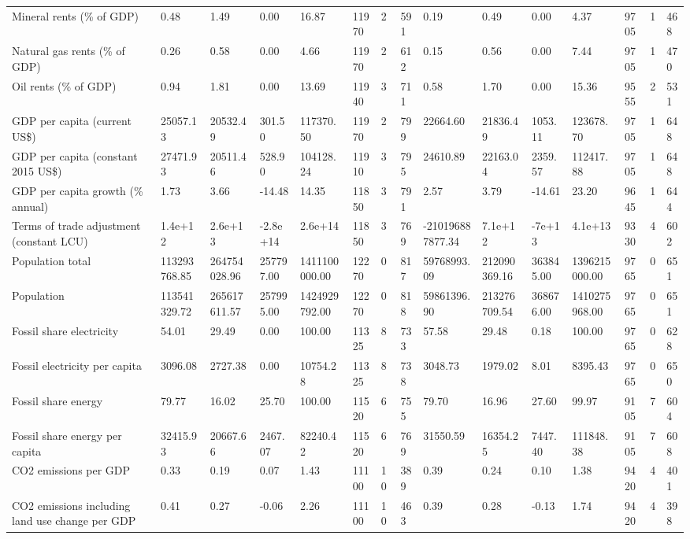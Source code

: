 \begin{longtable}{lllllllllllllll}
\addlinespace
Mineral rents (\% of GDP) & 0.48 & 1.49 & 0.00 & 16.87 & 11970 & 2 & 591 & 0.19 & 0.49 & 0.00 & 4.37 & 9705 & 1 & 468\\
Natural gas rents (\% of GDP) & 0.26 & 0.58 & 0.00 & 4.66 & 11970 & 2 & 612 & 0.15 & 0.56 & 0.00 & 7.44 & 9705 & 1 & 470\\
Oil rents (\% of GDP) & 0.94 & 1.81 & 0.00 & 13.69 & 11940 & 3 & 711 & 0.58 & 1.70 & 0.00 & 15.36 & 9555 & 2 & 531\\
GDP per capita (current US\$) & 25057.13 & 20532.49 & 301.50 & 117370.50 & 11970 & 2 & 799 & 22664.60 & 21836.49 & 1053.11 & 123678.70 & 9705 & 1 & 648\\
GDP per capita (constant 2015 US\$) & 27471.93 & 20511.46 & 528.90 & 104128.24 & 11910 & 3 & 795 & 24610.89 & 22163.04 & 2359.57 & 112417.88 & 9705 & 1 & 648\\
\addlinespace
GDP per capita growth (\% annual) & 1.73 & 3.66 & -14.48 & 14.35 & 11850 & 3 & 791 & 2.57 & 3.79 & -14.61 & 23.20 & 9645 & 1 & 644\\
Terms of trade adjustment (constant LCU) & 1.4e+12 & 2.6e+13 & -2.8e+14 & 2.6e+14 & 11850 & 3 & 769 & -210196887877.34 & 7.1e+12 & -7e+13 & 4.1e+13 & 9330 & 4 & 602\\
Population total & 113293768.85 & 264754028.96 & 257797.00 & 1411100000.00 & 12270 & 0 & 817 & 59768993.09 & 212090369.16 & 363845.00 & 1396215000.00 & 9765 & 0 & 651\\
Population & 113541329.72 & 265617611.57 & 257995.00 & 1424929792.00 & 12270 & 0 & 818 & 59861396.90 & 213276709.54 & 368676.00 & 1410275968.00 & 9765 & 0 & 651\\
Fossil share electricity & 54.01 & 29.49 & 0.00 & 100.00 & 11325 & 8 & 733 & 57.58 & 29.48 & 0.18 & 100.00 & 9765 & 0 & 628\\
\addlinespace
Fossil electricity per capita & 3096.08 & 2727.38 & 0.00 & 10754.28 & 11325 & 8 & 738 & 3048.73 & 1979.02 & 8.01 & 8395.43 & 9765 & 0 & 650\\
Fossil share energy & 79.77 & 16.02 & 25.70 & 100.00 & 11520 & 6 & 755 & 79.70 & 16.96 & 27.60 & 99.97 & 9105 & 7 & 604\\
Fossil share energy per capita & 32415.93 & 20667.66 & 2467.07 & 82240.42 & 11520 & 6 & 769 & 31550.59 & 16354.25 & 7447.40 & 111848.38 & 9105 & 7 & 608\\
CO2 emissions per GDP & 0.33 & 0.19 & 0.07 & 1.43 & 11100 & 10 & 389 & 0.39 & 0.24 & 0.10 & 1.38 & 9420 & 4 & 401\\
CO2 emissions including land use change per GDP & 0.41 & 0.27 & -0.06 & 2.26 & 11100 & 10 & 463 & 0.39 & 0.28 & -0.13 & 1.74 & 9420 & 4 & 398\\

\end{longtable}
